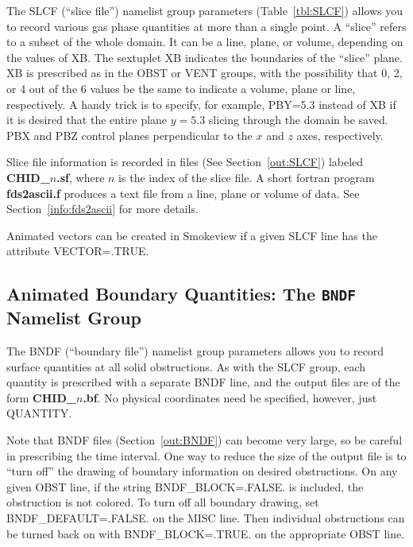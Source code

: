\documentclass[11pt]{book}
\begin{document}
The {\ct SLCF} (``slice file'') namelist group parameters (Table~\ref{tbl:SLCF})
allows you to record various gas phase quantities
at more than a single point. A ``slice'' refers to a subset of the whole domain. It can be a line,
plane, or volume, depending on the values of {\ct XB}.
The sextuplet {\ct XB} indicates the boundaries of the ``slice'' plane.
{\ct XB} is prescribed as in the {\ct OBST} or {\ct VENT} groups, with
the possibility that 0, 2, or 4 out of the 6 values be the same to
indicate a volume, plane or line, respectively. A handy trick is to
specify, for example, {\ct PBY=5.3} instead of {\ct XB} if it is desired
that the entire plane $y=5.3$ slicing through the domain be saved.
{\ct PBX} and {\ct PBZ} control planes perpendicular to the
$x$ and $z$ axes, respectively.

Slice file information is recorded in files (See Section~\ref{out:SLCF})
labeled {\bf CHID\_$n$.sf}, where $n$ is the index of the slice file.
A short fortran program {\bf fds2ascii.f} produces a text file from a line,
plane or volume of data. See Section~\ref{info:fds2ascii} for more details.

Animated vectors can be created in Smokeview if a given {\ct SLCF} line has the attribute {\ct VECTOR=.TRUE.}




\subsection{Animated Boundary Quantities: The \texorpdfstring{{\tt BNDF}}{BNDF} Namelist Group}%
\label{info:BNDF}

The {\ct BNDF} (``boundary file'') namelist group parameters allows you
to record surface quantities at all solid obstructions. As with
the {\ct SLCF} group, each quantity is prescribed with a separate
{\ct BNDF} line, and the output files are of the form {\bf CHID\_$n$.bf}.
No physical coordinates need be specified, however, just {\ct QUANTITY}.

Note that {\ct BNDF} files (Section~\ref{out:BNDF}) can become very
large, so be careful in prescribing the time interval.
One way to reduce the size of the output file is to ``turn off'' the
drawing of boundary information on desired obstructions. On any given
{\ct OBST} line, if the string {\ct BNDF\_BLOCK=.FALSE.} is included,
the obstruction is not colored. To turn off all boundary drawing,
set {\ct BNDF\_DEFAULT=.FALSE.} on the {\ct MISC} line. Then individual
obstructions can be turned back on with {\ct BNDF\_BLOCK=.TRUE.} on
the appropriate {\ct OBST} line.
\end{document}
